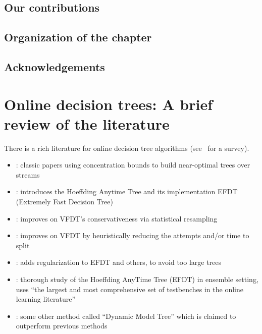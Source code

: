 \subsection{Our contributions}
\subsection{Organization of the chapter}
\subsection{Acknowledgements}

\section{Online decision trees: A brief review of the literature}
 There is a rich literature for online decision tree algorithms (see~\cite{Manapragada2022_AnEagerSplitting} for a survey).
\begin{itemize}
    \item \cite{Domingos2000_HighSpeedStreams,Domingos2001_MiningTimeSeries,Gama2003_HighSpeedStreams,Jin2003_EfficientDecisionTree,Rutkowski2013_DecisionTreesForMining}: classic papers using concentration bounds to build near-optimal trees over streams
    \item \cite{Manapragada2018_EFDT}: introduces the Hoeffding Anytime Tree and its implementation EFDT (Extremely Fast Decision Tree)
    \item \cite{Das2019_LearnSmartWithLess}: improves on VFDT's conservativeness via statistical resampling
   \item \cite{sun2020_SpeedingUpVeryFast}: improves on VFDT by heuristically reducing the attempts and/or time to split 
   \item \cite{Barddal2020_RegularizedAndIncremental}: adds regularization to EFDT and others, to avoid too large trees
   \item \cite{Manapragada2022_AnEagerSplitting}: thorough study of the Hoeffding AnyTime Tree (EFDT) in ensemble setting, uses “the largest and most comprehensive set of testbenches in the online learning literature”
   \item \cite{Haug2022_DynamicModelTree}: some other method called “Dynamic Model Tree” which is claimed to outperform previous methods
\end{itemize}

